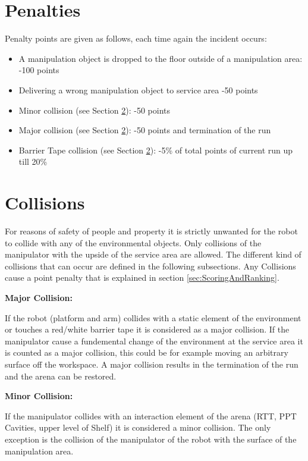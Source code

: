 \section{Penalties}
\label{sec:penalties}
Penalty points are given as follows, each time again the incident occurs:

\begin{itemize}
	\item A manipulation object is dropped to the floor outside of a manipulation area: \hfill -100 points
	\item Delivering a wrong manipulation object to service area \hfill -50 points
	\item Minor collision (see Section \ref{sec:Collisions}): \hfill -50 points
	\item Major collision (see Section \ref{sec:Collisions}): \hfill -50 points and termination of the run
  \item Barrier Tape collision (see Section \ref{sec:Collisions}): \hfill -5\% of total points of current run up till
  20\%
\end{itemize}

\section{Collisions}\label{sec:Collisions}

For reasons of safety of people and property it is strictly unwanted for the robot to collide
with any of the environmental objects. Only collisions of the manipulator with the upside of
the service area are allowed. The different kind of collisions that can occur are defined in the
following subsections. Any Collisions cause a point penalty that is explained in section \ref{sec:ScoringAndRanking}.  

\textbf{Major Collision:}

If the robot (platform and arm) collides with a static element of the environment or touches a red/white barrier tape it is considered as a major collision. If the manipulator cause a fundemental change of the environment at the service area it is counted as a major collision, this could be for example moving an arbitrary surface off the workspace. A major collision results in the termination of the run and the arena can be restored. 


\textbf{Minor Collision:}

If the manipulator collides with an interaction element of the arena (RTT, PPT Cavities, upper level
of Shelf) it is considered a minor collision. The only exception is the collision of the manipulator
of the robot with the surface of the manipulation area.

